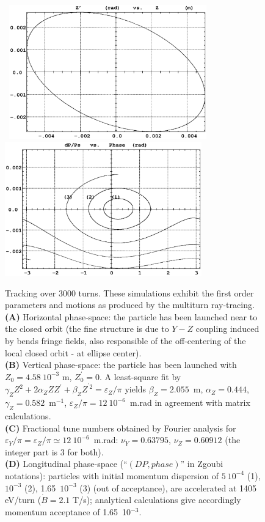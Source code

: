 \begin{figure}[H]
\begin{center}
\vspace{-10mm}
\mbox{
\includegraphics[height=5.8cm]{FigC6-2c.ps}
\includegraphics[height=5.8cm]{FigC6-2d.ps}
}

\vspace{-15mm}
\caption[FigC62]{\label{figC62} \small
Tracking  over 3000 turns. These 
simulations exhibit the first order parameters and 
motions as produced by the multiturn ray-tracing. \\
\textbf{(A)} Horizontal phase-space: the particle has been launched near to 
the  closed orbit (the fine structure is due to $Y-Z$ coupling induced by bends fringe fields, also 
responsible of the off-centering of the local closed orbit - at ellipse center). \\
\textbf{(B)} Vertical phase-space: the particle has been launched with 
$Z_0=4.58\ 10^{-3} $ m, $ Z^{\prime}_ 0=0$.  A least-square fit by 
$ \gamma_ZZ^2+2\alpha_ ZZZ^\prime +\beta_ ZZ^{^\prime 2}=\varepsilon_ Z/\pi $ 
 yields $ \beta_ Z=2.055 $~m, $ \alpha_Z=0.444$, $ \gamma_Z=0.582$~m$ ^{-1} $,  $ \varepsilon_Z/\pi =12\ 10^{-6}$~m.rad
 in agreement with  matrix calculations. \\
\textbf{(C)} Fractional tune numbers obtained by Fourier analysis 
for $ \varepsilon_ Y/\pi =\varepsilon_ Z/\pi \simeq 12\ 10^{-6} $~m.rad: 
$\nu_ Y=0.63795$,  $ \nu_ Z=0.60912 $ (the integer part is 3 for both). \\
\textbf{(D)} Longitudinal phase-space (``$(DP, phase)$'' in Zgoubi notations): particles with initial momentum dispersion 
of $ 5\ 10^{-4} $ (1), $ 10^{-3} $ (2),
1.65~$ 10^{-3}$ (3) (out of acceptance), are accelerated at 1405 eV/turn 
($\dot  B=2.1 $ T/s); analytical calculations give accordingly 
momentum acceptance of 1.65~10$^{-3} $. }
\end{center}

\end{figure}

